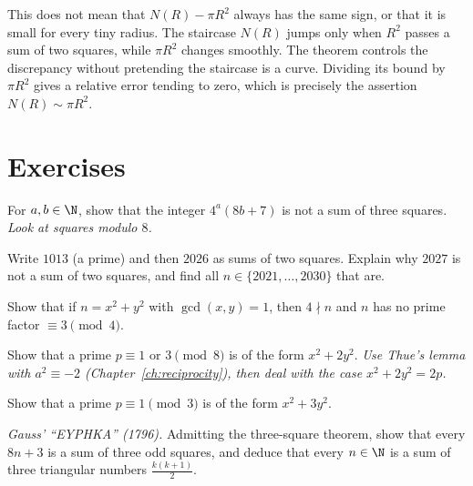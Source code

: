 This does not mean that $N(R)-\pi R^2$ always has the same sign, or that it is small for every tiny radius. The staircase $N(R)$ jumps only when $R^2$ passes a sum of two squares, while $\pi R^2$ changes smoothly. The theorem controls the discrepancy without pretending the staircase is a curve. Dividing its bound by $\pi R^2$ gives a relative error tending to zero, which is precisely the assertion $N(R)\sim\pi R^2$.

\section{Exercises}

\begin{exercise}[$\star$]\label{ex:three}
For $a,b\in\N$, show that the integer $4^a(8b+7)$ is not a sum of three squares. \emph{Look at squares modulo $8$.}
\end{exercise}

\begin{exercise}[$\star$]\label{ex:2026}
Write $1013$ (a prime) and then $2026$ as sums of two squares. Explain why $2027$ is not a sum of two squares, and find all $n\in\{2021,\dots,2030\}$ that are.
\end{exercise}

\begin{exercise}[$\star\star$]\label{ex:primitive2}
Show that if $n=x^2+y^2$ with $\gcd(x,y)=1$, then $4\nmid n$ and $n$ has no prime factor $\equiv3\pmod4$.
\end{exercise}

\begin{exercise}[$\star\star$]\label{ex:x2y2}
Show that a prime $p\equiv1$ or $3\pmod8$ is of the form $x^2+2y^2$. \emph{Use Thue's lemma with $a^2\equiv-2$ (Chapter~\ref{ch:reciprocity}), then deal with the case $x^2+2y^2=2p$.}
\end{exercise}

\begin{exercise}[$\star\star$]\label{ex:x3y2}
Show that a prime $p\equiv1\pmod3$ is of the form $x^2+3y^2$.
\end{exercise}

\begin{exercise}[$\star\star$]\label{ex:eureka}
\emph{Gauss' ``E\upshape{}YPHKA'' (1796).} Admitting the three-square theorem, show that every $8n+3$ is a sum of three odd squares, and deduce that every $n\in\N$ is a sum of three triangular numbers $\frac{k(k+1)}2$.
\end{exercise}

